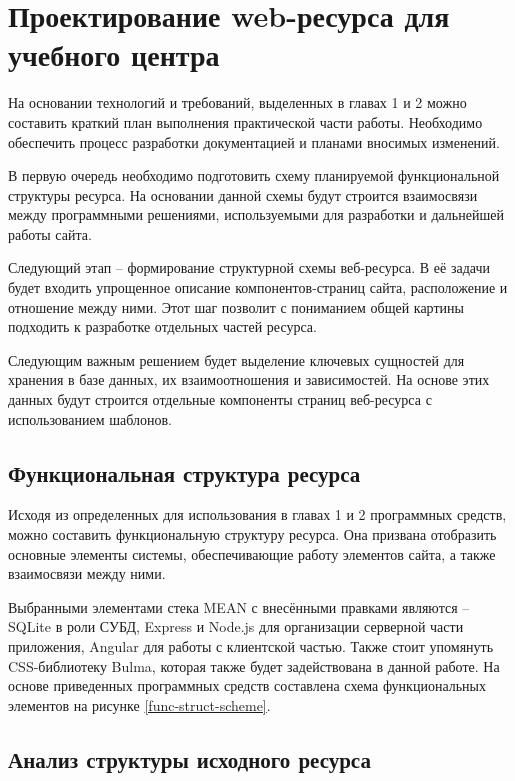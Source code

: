 \section{Проектирование web-ресурса для учебного центра}

На основании технологий и требований, выделенных в главах 1 и 2 можно составить краткий план выполнения практической части работы.
Необходимо обеспечить процесс разработки документацией и планами вносимых изменений.

В первую очередь необходимо подготовить схему планируемой функциональной структуры ресурса.
На основании данной схемы будут строится взаимосвязи между программными решениями, используемыми для разработки и дальнейшей работы сайта.

Следующий этап -- формирование структурной схемы веб-ресурса.
В её задачи будет входить упрощенное описание компонентов-страниц сайта, расположение и отношение между ними.
Этот шаг позволит с пониманием общей картины подходить к разработке отдельных частей ресурса.

Следующим важным решением будет выделение ключевых сущностей для хранения в базе данных, их взаимоотношения и зависимостей.
На основе этих данных будут строится отдельные компоненты страниц веб-ресурса с использованием шаблонов.


\subsection{Функциональная структура ресурса}

Исходя из определенных для использования в главах 1 и 2 программных средств, можно составить функциональную структуру ресурса.
Она призвана отобразить основные элементы системы, обеспечивающие работу элементов сайта, а также взаимосвязи между ними.

Выбранными элементами стека MEAN с внесёнными правками являются -- SQLite в роли СУБД, Express и Node.js для организации серверной части приложения, Angular для работы с клиентской частью.
Также стоит упомянуть CSS-библиотеку Bulma, которая также будет задействована в данной работе.
На основе приведенных программных средств составлена схема функциональных элементов на рисунке \ref{func-struct-scheme}.



\subsection{Анализ структуры исходного ресурса}\label{Анализ структуры исходного ресурса}

